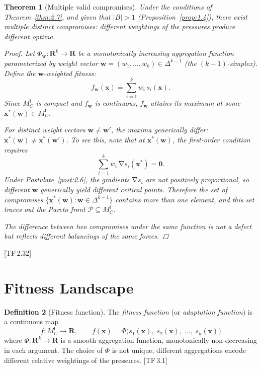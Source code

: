 \documentclass[10pt]{article}
\theoremstyle{definition}
\newtheorem{definition}{Definition}[section]
\theoremstyle{plain}
\newtheorem{theorem}[definition]{Theorem}
\theoremstyle{remark}
\newcommand{\MC}{M^{\mathsf{I}}_C}          %
\providecommand{\R}{}
\renewcommand{\R}{\mathbf{R}}               %
\newcommand{\Pareto}{\mathcal{P}}            %
\newcommand{\abs}[1]{\lvert #1 \rvert}
\DeclareMathOperator{\grad}{\nabla}
\newcommand{\TF}[1]{\textnormal{[TF\,#1]}}  %
\begin{document}
\begin{theorem}[Multiple valid compromises]\label{thm:2.8}
Under the conditions of Theorem~\ref{thm:2.7}, and given that
$\abs{B} > 1$ (Proposition~\ref{prop:1.4}), there exist multiple
distinct compromises: different weightings of the pressures produce
different optima.

\begin{proof}
Let $\Phi_{\bm{w}} : \R^k \to \R$ be a monotonically increasing
aggregation function parameterized by weight vector
$\bm{w} = (w_1, \ldots, w_k) \in \Delta^{k-1}$ (the $(k{-}1)$-simplex).
Define the $\bm{w}$-weighted fitness:
\[
  f_{\bm{w}}(\bm{x}) = \sum_{i=1}^{k} w_i \, s_i(\bm{x}).
\]
Since $\MC$ is compact and $f_{\bm{w}}$ is continuous,
$f_{\bm{w}}$ attains its maximum at some
$\bm{x}^*(\bm{w}) \in \MC$.

For distinct weight vectors $\bm{w} \neq \bm{w}'$, the maxima
generically differ: $\bm{x}^*(\bm{w}) \neq \bm{x}^*(\bm{w}')$.
To see this, note that at $\bm{x}^*(\bm{w})$, the first-order
condition requires
\[
  \sum_{i=1}^k w_i \, \grad s_i(\bm{x}^*) = \bm{0}.
\]
Under Postulate~\ref{post:2.6}, the gradients $\grad s_i$ are not
positively proportional, so different $\bm{w}$ generically yield
different critical points. Therefore the set of compromises
$\{\bm{x}^*(\bm{w}) : \bm{w} \in \Delta^{k-1}\}$ contains more than
one element, and this set traces out the \emph{Pareto front}
$\Pareto \subseteq \MC$.

The difference between two compromises under the same function is not a
defect but reflects different balancings of the same forces. \qedhere
\end{proof}
\end{theorem}

\TF{2.32}

\newpage
\section{Fitness Landscape}\label{sec:landscape}

\begin{definition}[Fitness function]\label{def:3.1}
The \emph{fitness function} (or \emph{adaptation function}) is a
continuous map
\[
  f : \MC \longrightarrow \R, \qquad
  f(\bm{x}) = \Phi\bigl(s_1(\bm{x}),\; s_2(\bm{x}),\; \ldots,\;
  s_k(\bm{x})\bigr)
\]
where $\Phi : \R^k \to \R$ is a smooth aggregation function,
monotonically non-decreasing in each argument. The choice of $\Phi$
is not unique; different aggregations encode different relative weightings
of the pressures. \TF{3.1}
\end{definition}
\end{document}
